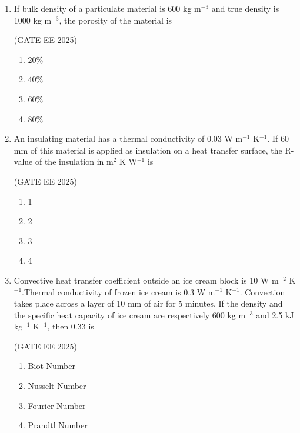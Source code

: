 \documentclass[journal,12pt,onecolumn]{IEEEtran}
\theoremstyle{remark}
\begin{document}
\begin{enumerate}
\item If bulk density of a particulate material is 600 kg m$^{-3}$ and true density is 1000 kg m$^{-3}$, the porosity of the material is

\hfill(GATE EE 2025)

\begin{multicols}{4}
\begin{enumerate}
    \item 20\%
    \item 40\%
    \item 60\%
    \item 80\%
\end{enumerate}
\end{multicols}

\item An insulating material has a thermal conductivity of 0.03 W m$^{-1}$ K$^{-1}$. If 60 mm of this material is applied as insulation on a heat transfer surface, the R-value of the insulation in m$^{2}$ K W$^{-1}$ is

\hfill(GATE EE 2025)

\begin{multicols}{4}
\begin{enumerate}
    \item 1
    \item 2
    \item 3
    \item 4
\end{enumerate}
\end{multicols}

\item Convective heat transfer coefficient outside an ice cream block is 10 W m$^{-2}$ K$^{-1}$.Thermal conductivity of frozen ice cream is 0.3 W m$^{-1}$ K$^{-1}$. Convection takes place across a layer of 10 mm of air for 5 minutes. If the density and the specific heat capacity of ice cream are respectively 600 kg m$^{-3}$ and 2.5 kJ kg$^{-1}$ K$^{-1}$, then 0.33 is

\hfill(GATE EE 2025)

\begin{multicols}{4}
\begin{enumerate}
    \item Biot Number
    \item Nusselt Number
    \item Fourier Number
    \item Prandtl Number
\end{enumerate}
\end{multicols}


\end{enumerate}
\end{document}
